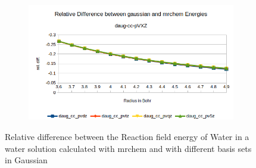 \documentclass[../master_thesis.tex]{subfiles}
\begin{document}
\begin{figure}[h!]
\begin{subfigure}[b]{\linewidth}
    \includegraphics[width=\linewidth]{img/watdaugreldiff.png}
  \end{subfigure}
  \caption{Relative difference between the Reaction field energy of Water in a water solution calculated with mrchem
  and with different basis sets in Gaussian}
  \label{fig:watreldiff}
\end{figure}
\end{document}
